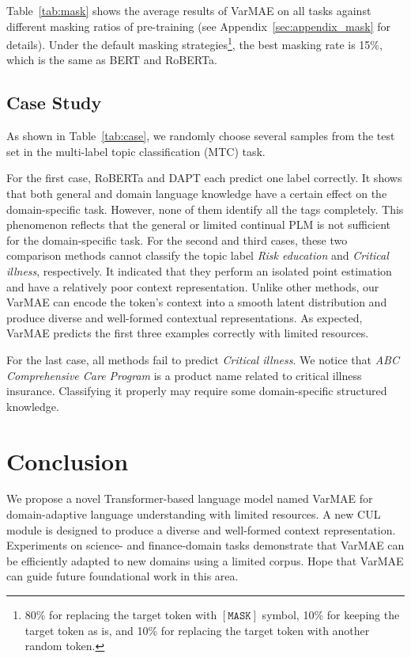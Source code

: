 \documentclass[11pt]{article}
\begin{document}
Table~\ref{tab:mask} shows the average results of VarMAE on all tasks against different masking ratios of pre-training {(see Appendix~\ref{sec:appendix_mask} for details)}. 
Under the default masking strategies\footnote{{
80\% for replacing the target token with $\mathtt{[MASK]}$ symbol, 10\% for keeping the target token as is, and 10\% for replacing the target token with another random token.}}, 
the best masking rate is 15\%, which is the same as BERT and RoBERTa.



\subsection{Case Study}
As shown in Table~\ref{tab:case}, we randomly choose several samples from the test set in the multi-label topic classification (MTC) task. 

For the first {case}, RoBERTa and DAPT each predict one label correctly. 
It shows that both general and domain language knowledge have a certain effect on the domain-specific task.
However, none of them identify all the tags completely.
This phenomenon reflects that the general or limited continual PLM is not sufficient for the domain-specific task.
For the second and third {cases}, these two comparison methods cannot classify the topic label \textit{Risk education} and \textit{Critical illness}, respectively.
It indicated that they perform an isolated point estimation and have a relatively poor context representation.
Unlike other methods, our VarMAE can encode the token's context into a smooth latent distribution and produce diverse and well-formed contextual representations.
As expected, VarMAE predicts the first three examples correctly with limited resources.

For the last case, all methods fail to predict \textit{Critical illness}. 
We notice that \textit{ABC Comprehensive Care Program} is a product name related to critical illness insurance. Classifying it properly may require some domain-specific structured knowledge. 

\section{Conclusion}

We propose a novel Transformer-based language model named VarMAE for domain-adaptive language understanding with limited resources. A new CUL module is designed to produce a diverse and well-formed context representation. Experiments on science- and finance-domain tasks demonstrate that VarMAE can be efficiently adapted to new domains using a limited corpus. 
Hope that VarMAE can guide future foundational work in this area. 
\end{document}
